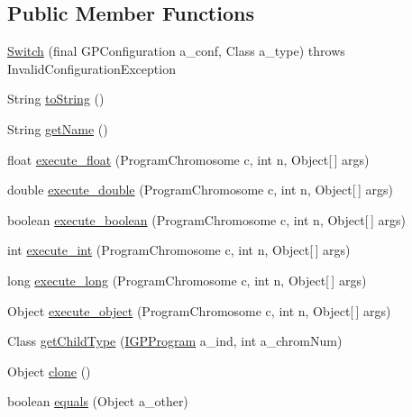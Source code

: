\subsection*{Public Member Functions}
\begin{DoxyCompactItemize}
\item 
\hyperlink{classorg_1_1jgap_1_1gp_1_1function_1_1_switch_a8e15ac8617e759e5e901a38dfa009a97}{Switch} (final G\-P\-Configuration a\-\_\-conf, Class a\-\_\-type)  throws Invalid\-Configuration\-Exception 
\item 
String \hyperlink{classorg_1_1jgap_1_1gp_1_1function_1_1_switch_a205332cf325c4fc39c652f37cce71443}{to\-String} ()
\item 
String \hyperlink{classorg_1_1jgap_1_1gp_1_1function_1_1_switch_a6e8f800b5623a079ff2443f9171c5893}{get\-Name} ()
\item 
float \hyperlink{classorg_1_1jgap_1_1gp_1_1function_1_1_switch_a1d3461c65af9851c3a066c0b2639b543}{execute\-\_\-float} (Program\-Chromosome c, int n, Object\mbox{[}$\,$\mbox{]} args)
\item 
double \hyperlink{classorg_1_1jgap_1_1gp_1_1function_1_1_switch_a761d478946f84939998e0f4168b08055}{execute\-\_\-double} (Program\-Chromosome c, int n, Object\mbox{[}$\,$\mbox{]} args)
\item 
boolean \hyperlink{classorg_1_1jgap_1_1gp_1_1function_1_1_switch_a670dd3bbc7524a22183052256ecfe51b}{execute\-\_\-boolean} (Program\-Chromosome c, int n, Object\mbox{[}$\,$\mbox{]} args)
\item 
int \hyperlink{classorg_1_1jgap_1_1gp_1_1function_1_1_switch_a6d8f78a80b2d33b762a79dd73a6a2441}{execute\-\_\-int} (Program\-Chromosome c, int n, Object\mbox{[}$\,$\mbox{]} args)
\item 
long \hyperlink{classorg_1_1jgap_1_1gp_1_1function_1_1_switch_a1d0bde30cea0af34b60bec4bd6072f9d}{execute\-\_\-long} (Program\-Chromosome c, int n, Object\mbox{[}$\,$\mbox{]} args)
\item 
Object \hyperlink{classorg_1_1jgap_1_1gp_1_1function_1_1_switch_af8b276b4375217edc68112f047d977d8}{execute\-\_\-object} (Program\-Chromosome c, int n, Object\mbox{[}$\,$\mbox{]} args)
\item 
Class \hyperlink{classorg_1_1jgap_1_1gp_1_1function_1_1_switch_a54a605b22ebbf920c069841335dc3f49}{get\-Child\-Type} (\hyperlink{interfaceorg_1_1jgap_1_1gp_1_1_i_g_p_program}{I\-G\-P\-Program} a\-\_\-ind, int a\-\_\-chrom\-Num)
\item 
Object \hyperlink{classorg_1_1jgap_1_1gp_1_1function_1_1_switch_a32a213cc12d17b409b3ce0ead5211df9}{clone} ()
\item 
boolean \hyperlink{classorg_1_1jgap_1_1gp_1_1function_1_1_switch_a3346fa75b51e7cfd8f84497b708aee55}{equals} (Object a\-\_\-other)
\end{DoxyCompactItemize}
